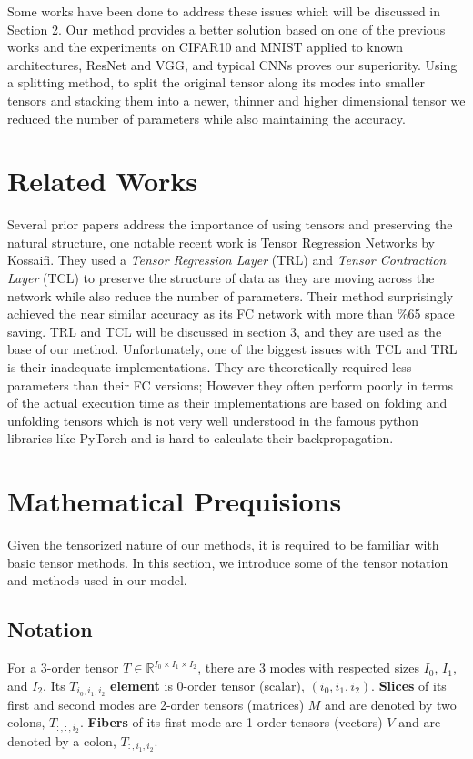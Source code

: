 \documentclass[runningheads]{llncs}
\begin{document}
Some works have been done to address these issues which will be discussed in Section 2. Our method provides a better solution based on one of the previous works and the experiments on CIFAR10 and MNIST applied to known architectures, ResNet and VGG, and typical CNNs proves our superiority. Using a splitting method, to split the original tensor along its modes into smaller tensors and stacking them into a newer, thinner and higher dimensional tensor we reduced the number of parameters while also maintaining the accuracy.

\section{Related Works}
\label{sec:related-work}

Several prior papers address the importance of using tensors and preserving the natural structure, one notable recent work is Tensor Regression Networks \cite{kossaifi2020tensor} by Kossaifi. They used a \textit{Tensor Regression Layer} (TRL) and \textit{Tensor Contraction Layer} (TCL) to preserve the structure of data as they are moving across the network while also reduce the number of parameters. Their method surprisingly achieved the near similar accuracy as its FC network with more than \%65 space saving. TRL and TCL will be discussed in section 3, and they are used as the base of our method. Unfortunately, one of the biggest issues with TCL and TRL is their inadequate implementations. They are theoretically required less parameters than their FC versions; However they often perform poorly in terms of the actual execution time as their implementations are based on folding and unfolding tensors which is not very well understood in the famous python libraries like PyTorch and is hard to calculate their backpropagation.

\section{Mathematical Prequisions}
\label{sec:mathematical-prequisions}
Given the tensorized nature of our methods, it is required to be familiar with basic tensor methods. In this section, we introduce some of the tensor notation and methods used in our model.

\subsection{Notation}
\label{subsec:notation}
For a 3-order tensor $T\in \mathbb{R}^{I_0\times I_1\times I_2}$, there are 3 modes with respected sizes $I_0$, $I_1$, and $I_2$. 
Its $T_{i_0, i_1, i_2}$ 
\textbf{element}
is 0-order tensor (scalar), $(i_0, i_1, i_2)$. 
\textbf{Slices} of its first and second modes are 2-order tensors (matrices) $M$ and are denoted by two colons, $T_{:,:,i_2}$. 
\textbf{Fibers} of its first mode are 1-order tensors (vectors) $V$ and are denoted by a colon, $T_{:, i_1, i_2}$.
\end{document}
